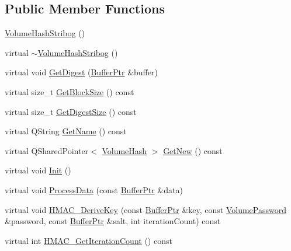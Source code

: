 \subsection*{Public Member Functions}
\begin{DoxyCompactItemize}
\item 
\hyperlink{class_gost_crypt_1_1_volume_1_1_volume_hash_stribog_a251f6c24166d1c18eb86b2428dcf2232}{Volume\+Hash\+Stribog} ()
\item 
virtual \hyperlink{class_gost_crypt_1_1_volume_1_1_volume_hash_stribog_afef640b63d94f2ad853fa1c2cdf681be}{$\sim$\+Volume\+Hash\+Stribog} ()
\item 
virtual void \hyperlink{class_gost_crypt_1_1_volume_1_1_volume_hash_stribog_a90a203ac607353bad84ebb6f6ad09cda}{Get\+Digest} (\hyperlink{class_gost_crypt_1_1_buffer_ptr}{Buffer\+Ptr} \&buffer)
\item 
virtual size\+\_\+t \hyperlink{class_gost_crypt_1_1_volume_1_1_volume_hash_stribog_a27b7f587f66155c0edf88af3eb84686a}{Get\+Block\+Size} () const
\item 
virtual size\+\_\+t \hyperlink{class_gost_crypt_1_1_volume_1_1_volume_hash_stribog_ad29dc8a4e0ed0f2f3e20afc2f691c74d}{Get\+Digest\+Size} () const
\item 
virtual Q\+String \hyperlink{class_gost_crypt_1_1_volume_1_1_volume_hash_stribog_a8a6c7c3679703c27e816be9679d44250}{Get\+Name} () const
\item 
virtual Q\+Shared\+Pointer$<$ \hyperlink{class_gost_crypt_1_1_volume_1_1_volume_hash}{Volume\+Hash} $>$ \hyperlink{class_gost_crypt_1_1_volume_1_1_volume_hash_stribog_a8a567d48e7edcb82128d931378468eff}{Get\+New} () const
\item 
virtual void \hyperlink{class_gost_crypt_1_1_volume_1_1_volume_hash_stribog_a0b2d7f2bbf5ee60590efdff1fef219a1}{Init} ()
\item 
virtual void \hyperlink{class_gost_crypt_1_1_volume_1_1_volume_hash_stribog_ab3da67dc6f8ae8b092c089e5f174876e}{Process\+Data} (const \hyperlink{class_gost_crypt_1_1_buffer_ptr}{Buffer\+Ptr} \&data)
\item 
virtual void \hyperlink{class_gost_crypt_1_1_volume_1_1_volume_hash_stribog_a691a1c92b9a4b33e817c72b7aa50bc61}{H\+M\+A\+C\+\_\+\+Derive\+Key} (const \hyperlink{class_gost_crypt_1_1_buffer_ptr}{Buffer\+Ptr} \&key, const \hyperlink{class_gost_crypt_1_1_volume_1_1_volume_password}{Volume\+Password} \&password, const \hyperlink{class_gost_crypt_1_1_buffer_ptr}{Buffer\+Ptr} \&salt, int iteration\+Count) const
\item 
virtual int \hyperlink{class_gost_crypt_1_1_volume_1_1_volume_hash_stribog_a7c3a5d51633b91a39d58edd4376a6199}{H\+M\+A\+C\+\_\+\+Get\+Iteration\+Count} () const
\end{DoxyCompactItemize}

